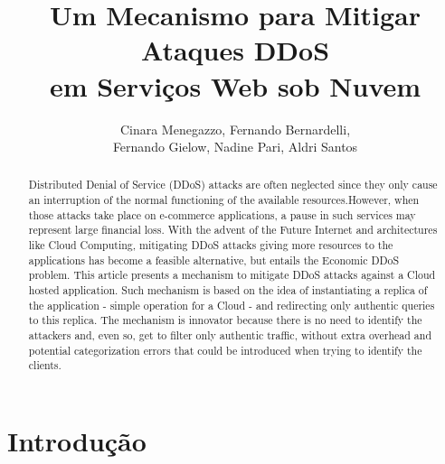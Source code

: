 \documentclass[a4paper, 12pt]{article}
\begin{document}
\title{Um Mecanismo para Mitigar Ataques DDoS\\ em Serviços Web sob Nuvem}


\author{
Cinara Menegazzo, Fernando Bernardelli, \\
Fernando Gielow, Nadine Pari, Aldri Santos
}
   
\address{Departamento de Informática -- Universidade Federal do Paraná\\
NR2 - Núcleo de Redes Sem Fio e Redes Avançadas -- Curitiba -- Brasil
}     

\maketitle

{\footnotesize

\begin{abstract}
Distributed Denial of Service (DDoS) attacks are often neglected since they only cause an interruption of the normal functioning of the available resources.However, when those attacks take place on e-commerce applications, a pause in such services may represent large financial loss. With the advent of the Future Internet and architectures like Cloud Computing, mitigating DDoS attacks giving more resources to the applications has become a feasible alternative, but entails the Economic DDoS problem. This article presents a mechanism to mitigate DDoS attacks against a Cloud hosted application. Such mechanism is based on the idea of instantiating a replica of the application - simple operation for a Cloud - and redirecting only authentic queries to this replica. The mechanism is innovator because there is no need to identify the attackers and, even so, get to filter only authentic traffic, without extra overhead and potential categorization errors that could be introduced when trying to identify the clients.
%
\end{abstract}

\begin{resumo}

\end{resumo}

}

\section{Introdução}

\end{document}
